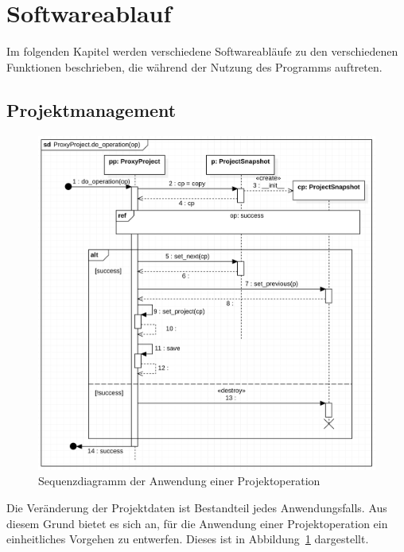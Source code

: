 \documentclass{article}
\begin{document}
\newpage
\section{Softwareablauf}

Im folgenden Kapitel werden verschiedene Softwareabläufe zu den verschiedenen Funktionen beschrieben, die während der Nutzung des Programms auftreten.

\subsection{Projektmanagement}
\begin{figure}[H]%
    \centering
    \includegraphics[width=13cm]{entwurf/Entwurf_dokument/img/Michael/sd_ProxyProject.do_operation.png}
    \caption{Sequenzdiagramm der Anwendung einer Projektoperation}
    \label{fig:sd:do_operation}
\end{figure}

Die Veränderung der Projektdaten ist Bestandteil jedes Anwendungsfalls. Aus diesem Grund bietet es sich an, für die Anwendung einer Projektoperation ein einheitliches Vorgehen zu entwerfen. Dieses ist in Abbildung~\ref{fig:sd:do_operation} dargestellt.\\
\end{document}
